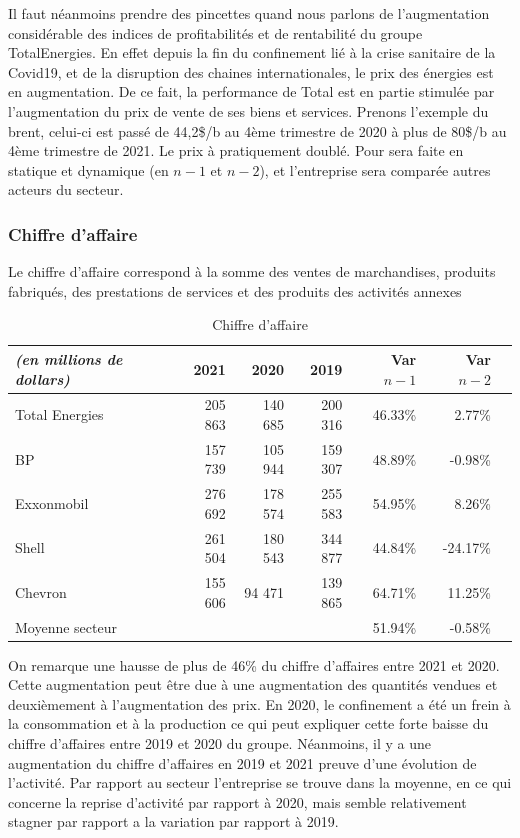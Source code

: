\documentclass[12pt]{article}
\begin{document}
Il faut néanmoins prendre des pincettes quand nous parlons de l'augmentation considérable des indices de profitabilités et de rentabilité du groupe TotalEnergies. En effet depuis la 
fin du confinement lié à la crise sanitaire de la Covid19, et de la disruption des chaines internationales, le prix des énergies est en augmentation. De ce 
fait, la performance de Total est en partie stimulée par l'augmentation du prix de vente de ses biens et services.
Prenons l'exemple du brent, celui-ci est passé de 44,2\$/b  au 4ème trimestre de 2020 à plus de 80\$/b au 4ème trimestre de 2021. Le prix à pratiquement doublé.
Pour sera faite en statique et dynamique (en $n-1$ et $n-2$), et l'entreprise sera comparée autres acteurs du secteur.

\subsubsection{Chiffre d'affaire}
Le chiffre d'affaire correspond à la somme des ventes de marchandises, produits fabriqués, des prestations de services et des produits des activités annexes
\begin{table}[H]
    \sffamily
    \centering
    \caption{Chiffre d'affaire}
    \label{table:CA}
    \begin{tabular}{l*{1}{rrrrrr}}
        \toprule
        \textit{(en millions de dollars)} & \textbf{2021} & 2020 & 2019 & Var $n-1$ & Var $n-2$ \\
        \midrule
        Total Energies & 205 863 & 140 685 & 200 316 & 46.33\% & 2.77\% \\
        \midrule
        BP & 157 739 & 105 944 & 159 307 & 48.89\% & -0.98\% \\
        Exxonmobil & 276 692 & 178 574 & 255 583 & 54.95\% & 8.26\% \\ 
        Shell & 261 504 & 180 543 & 344 877 & 44.84\% & -24.17\% \\
        Chevron & 155 606 & 94 471 & 139 865 & 64.71\% & 11.25\% \\ 
    \midrule
        Moyenne secteur & ~ & ~ & ~ & 51.94\% & -0.58\% \\
    \bottomrule
    \end{tabular}
\end{table}
On remarque une hausse de plus de 46\% du chiffre d'affaires entre 2021 et 2020. Cette augmentation peut être due à une augmentation des quantités vendues et deuxièmement à l'augmentation des prix. En 2020, le confinement a été un frein à la consommation et à la production ce qui peut expliquer cette forte baisse du chiffre d'affaires entre 2019 et 2020 du groupe. Néanmoins, il y a une augmentation du chiffre d'affaires en 2019 et 2021 preuve d'une évolution de l'activité.
Par rapport au secteur l'entreprise se trouve dans la moyenne, en ce qui concerne la reprise d'activité par rapport à 2020, mais semble relativement stagner par rapport a la variation par rapport à 2019.
\end{document}
